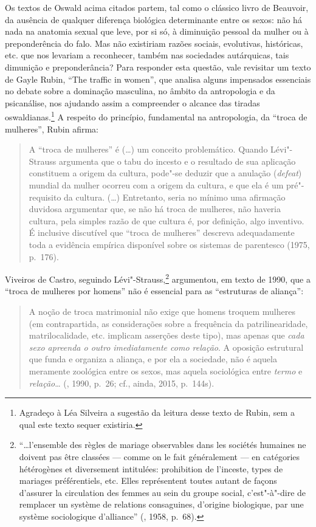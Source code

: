 Os textos de Oswald acima citados partem, tal como o clássico livro de
Beauvoir, da ausência de qualquer diferença biológica determinante entre
os sexos: não há nada na anatomia sexual que leve, por si só, à
diminuição pessoal da mulher ou à preponderência do falo. Mas não
existiriam razões sociais, evolutivas, históricas, etc. que nos levariam
a reconhecer, também nas sociedades autárquicas, tais dimunição e
preponderância? Para responder esta questão, vale revisitar um texto de
Gayle Rubin, ``The traffic in women'', que analisa alguns
impensados essenciais no debate sobre a dominação masculina, no âmbito
da antropologia e da psicanálise, nos ajudando assim a compreender o
alcance das tiradas oswaldianas.\footnote{Agradeço à Léa Silveira a
  sugestão da leitura desse texto de Rubin, sem a qual este texto sequer
  existiria.} A respeito do princípio, fundamental na antropologia, da
``troca de mulheres'', Rubin afirma:

\begin{quote}
A ``troca de mulheres'' é (\ldots{}) um conceito problemático. Quando
Lévi"-Strauss argumenta que o tabu do incesto e o resultado de sua
aplicação constituem a origem da cultura, pode"-se deduzir que a anulação
(\emph{defeat}) mundial da mulher ocorreu com a origem da cultura, e que
ela é um pré"-requisito da cultura. (\ldots{}) Entretanto, seria no mínimo uma
afirmação duvidosa argumentar que, se não há troca de mulheres, não
haveria cultura, pela simples razão de que cultura é, por definição,
algo inventivo. É inclusive discutível que ``troca de mulheres''
descreva adequadamente toda a evidência empírica disponível sobre os
sistemas de parentesco (1975, p.~176).
\end{quote}

Viveiros de Castro, seguindo Lévi"-Strauss,\footnote{``\ldots{}l'ensemble des
  règles de mariage observables dans les sociétés humaines ne doivent
  pas être classées --- comme on le fait généralement --- en catégories
  hétérogènes et diversement intitulées: prohibition de l'inceste,
  types de mariages préférentiels, etc. Elles représentent toutes autant
  de façons d'assurer la circulation des femmes au sein du groupe
  social, c'est"-à"-dire de remplacer un système de relations consaguines,
  d'origine biologique, par une système sociologique d'alliance''
  (, 1958, p.~68).} argumentou, em texto de 1990, que a ``troca
de mulheres por homens'' não é essencial para as ``estruturas de
aliança'':

\begin{quote}
A noção de troca matrimonial não exige que homens troquem mulheres (em
contrapartida, as considerações sobre a frequência da patrilinearidade,
matrilocalidade, etc. implicam asserções deste tipo), mas apenas que
\emph{cada sexo apreenda o outro imediatamente como relação}. A oposição
estrutural que funda e organiza a aliança, e por ela a sociedade, não é
aquela meramente zoológica entre os sexos, mas aquela sociológica entre
\emph{termo} e \emph{relação}\ldots{} (, 1990, p.~26; cf., ainda, 2015, p.~144s).
\end{quote}

